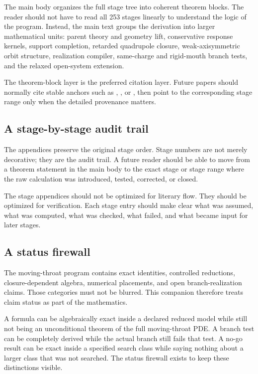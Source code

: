 The main body organizes the full stage tree into coherent theorem blocks.  The reader should not have to read all 253 stages linearly to understand the logic of the program.  Instead, the main text groups the derivation into larger mathematical units: parent theory and geometry lift, conservative response kernels, support completion, retarded quadrupole closure, weak-axisymmetric orbit structure, realization compiler, same-charge and rigid-mouth branch tests, and the relaxed open-system extension.

The theorem-block layer is the preferred citation layer.  Future papers should normally cite stable anchors such as , , or , then point to the corresponding stage range only when the detailed provenance matters.

\subsection{A stage-by-stage audit trail}

The appendices preserve the original stage order.  Stage numbers are not merely decorative; they are the audit trail.  A future reader should be able to move from a theorem statement in the main body to the exact stage or stage range where the raw calculation was introduced, tested, corrected, or closed.

The stage appendices should not be optimized for literary flow.  They should be optimized for verification.  Each stage entry should make clear what was assumed, what was computed, what was checked, what failed, and what became input for later stages.

\subsection{A status firewall}

The moving-throat program contains exact identities, controlled reductions, closure-dependent algebra, numerical placements, and open branch-realization claims.  Those categories must not be blurred.  This companion therefore treats claim status as part of the mathematics.

A formula can be algebraically exact inside a declared reduced model while still not being an unconditional theorem of the full moving-throat PDE.  A branch test can be completely derived while the actual branch still fails that test.  A no-go result can be exact inside a specified search class while saying nothing about a larger class that was not searched.  The status firewall exists to keep these distinctions visible.

